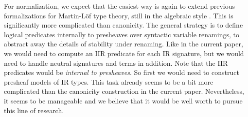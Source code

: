 \documentclass[acmsmall,screen,review,anonymous]{acmart}
\begin{document}
For normalization, we expect that the easiest way is again to extend previous formalizations for
Martin-Löf type theory, still in the algebraic style
\cite{DBLP:journals/lmcs/AltenkirchK17,coquand2018canonicity,sterlingthesis,DBLP:conf/fscd/BocquetKS23}. This
is significantly more complicated than canonicity. The general strategy is to define logical
predicates internally to presheaves over syntactic variable renamings, to abstract away the details
of stability under renaming. Like in the current paper, we would need to compute an IIR predicate
for each IR signature, but we would need to handle neutral signatures and terms in addition. Note
that the IIR predicates would be \emph{internal to presheaves}. So first we would need to
construct presheaf models of IR types. This task already seems to be a bit more complicated than the
canonicity construction in the current paper. Nevertheless, it seems to be manageable and we believe
that it would be well worth to pursue this line of research.



\end{document}
